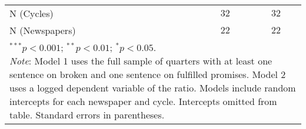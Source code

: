\begin{table}[!h]
\begin{center}
\begin{footnotesize}
\begin{tabular}{l c c}
N (Cycles)                         & $32$         & $32$         \\
N (Newspapers)                     & $22$         & $22$         \\
\hline
\multicolumn{3}{l}{\tiny{\parbox{.7\linewidth}{\footnotesize \vspace{2pt}$^{***}p<0.001$; $^{**}p<0.01$; $^{*}p<0.05$. \\
       \textit{Note}: Model 1 uses the full sample of quarters with at least one sentence on broken and one sentence on
       fulfilled promises.  Model 2 uses a logged dependent variable of the ratio. 
       Models include random intercepts for each newspaper and cycle. Intercepts omitted from table. Standard errors in parentheses.}}}
\end{tabular}
\end{footnotesize}
\label{tab:reg_brokenfulfilld_deductive}
\end{center}
\end{table}
